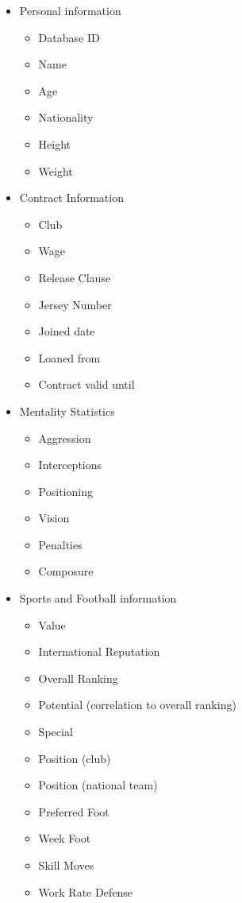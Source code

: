 \setlength{\columnseprule}{0.4pt}
\begin{multicols}{3}
\begin{itemize}
\item	Personal information
\begin{itemize}
\item	Database ID
\item	Name
\item	Age
\item	Nationality
\item	Height 
\item	Weight
\end{itemize}
\item	Contract Information
\begin{itemize}
\item	Club
\item	Wage
\item	Release Clause
\item	Jersey Number
\item	Joined date
\item	Loaned from
\item	Contract valid until
\end{itemize}
\item	Mentality Statistics
\begin{itemize}
\item	Aggression
\item	Interceptions
\item	Positioning
\item	Vision
\item	Penalties
\item	Composure
\columnbreak
\end{itemize}
\item	Sports and Football information
\begin{itemize}
\item	Value 
\item	International Reputation
\item	Overall Ranking
\item	Potential (correlation to overall ranking)
\item	Special 
\item	Position (club)
\item	Position (national team)
\item	Preferred Foot
\item	Week Foot
\item	Skill Moves
\item	Work Rate Defense

\end{itemize}
\end{itemize}
\end{multicols}

